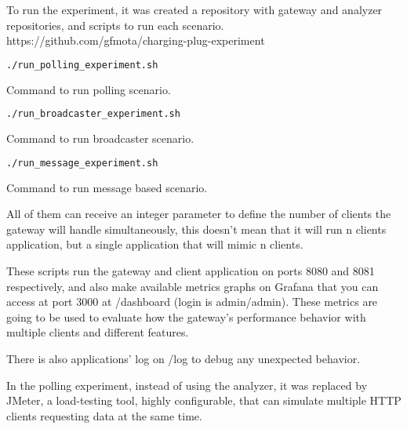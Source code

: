 To run the experiment, it was created a repository with gateway and analyzer repositories, and scripts to run each scenario. https://github.com/gfmota/charging-plug-experiment

\begin{program}
    \centering
  
  \begin{lstlisting}[language=bash, style=wider]
 ./run_polling_experiment.sh
  \end{lstlisting}
  
    \caption{Command to run polling scenario.\label{prog:java1}}
\end{program}

\begin{program}
    \centering
  
  \begin{lstlisting}[language=bash, style=wider]
 ./run_broadcaster_experiment.sh
  \end{lstlisting}
  
    \caption{Command to run broadcaster scenario.\label{prog:java2}}
\end{program}

\begin{program}
    \centering
  
  \begin{lstlisting}[language=bash, style=wider]
 ./run_message_experiment.sh
  \end{lstlisting}
  
    \caption{Command to run message based scenario.\label{prog:java3}}
\end{program}

All of them can receive an integer parameter to define the number of clients the gateway will handle simultaneously, this doesn't mean that it will run n clients application, but a single application that will mimic n clients.

These scripts run the gateway and client application on ports 8080 and 8081 respectively, and also make available metrics graphs on Grafana that you can access at port 3000 at /dashboard (login is admin/admin). These metrics are going to be used to evaluate how the gateway's performance behavior with multiple clients and different features.

There is also applications' log on /log to debug any unexpected behavior.

In the polling experiment, instead of using the analyzer, it was replaced by JMeter, a load-testing tool, highly configurable, that can simulate multiple HTTP clients requesting data at the same time.

